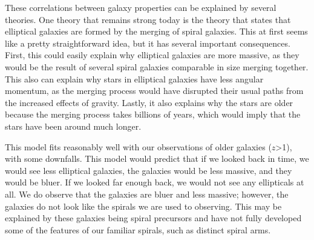 \documentclass[12pt]{article}
\begin{document}
These correlations between galaxy properties can be explained by several
theories.  One theory that remains strong today is the theory that states that
elliptical galaxies are formed by the merging of spiral galaxies.  This at first
seems like a pretty straightforward idea, but it has several important
consequences.  First, this could easily explain why elliptical galaxies are more
massive, as they would be the result of several spiral galaxies comparable in
size merging together.  This also can explain why stars in elliptical galaxies
have less angular momentum, as the merging process would have disrupted their
usual paths from the increased effects of gravity.  Lastly, it also explains why
the stars are older because the merging process takes billions of years, which
would imply that the stars have been around much longer.

This model fits reasonably well with our observations of older galaxies ($z$>1),
with some downfalls. This model would predict that if we looked back in time, we
would see less elliptical galaxies, the galaxies would be less massive, and they
would be bluer.  If we looked far enough back, we would not see any ellipticals
at all.  We do observe that the galaxies are bluer and less massive; however,
the galaxies do not look like the spirals we are used to observing.  This may be
explained by these galaxies being spiral precursors and have not fully developed
some of the features of our familiar spirals, such as distinct spiral arms.
\end{document}
